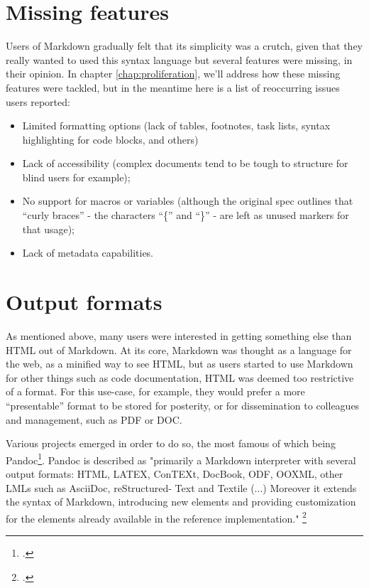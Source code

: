 \section{Missing features}

Users of Markdown gradually felt that its simplicity was a crutch, given that they really wanted to used this syntax language but several
features were missing, in their opinion. In chapter \ref{chap:proliferation}, we'll address how these missing features were tackled, but
in the meantime here is a list of reoccurring issues users reported:

\begin{itemize}
    \item Limited formatting options (lack of tables, footnotes, task lists, syntax highlighting for code blocks, and others)
    \item Lack of accessibility (complex documents tend to be tough to structure for blind users for example);
    \item No support for macros or variables (although the original spec outlines that ``curly braces'' - the characters ``\{'' and ``\}''
    - are left as unused markers for that usage);
    \item Lack of metadata capabilities.
\end{itemize}

\section{Output formats}

As mentioned above, many users were interested in getting something else than HTML out of Markdown. At its core, Markdown was thought as
a language for the web, as a minified way to see HTML, but as users started to use Markdown for other things such as code documentation,
HTML was deemed too restrictive of a format. For this use-case, for example, they would prefer a more ``presentable'' format to be stored
for posterity, or for dissemination to colleagues and management, such as PDF or DOC.\newline

Various projects emerged in order to do so, the most famous of which being Pandoc\footcite{pandoc}. Pandoc is described as "primarily a Markdown
interpreter with several output formats: HTML, LATEX, ConTEXt, DocBook, ODF, OOXML, other LMLs such as AsciiDoc, reStructured-
Text and Textile (...) Moreover it extends the syntax of Markdown, introducing new elements and providing customization for the elements already
available in the reference implementation." \footcite{dominici2014overview} \newline

